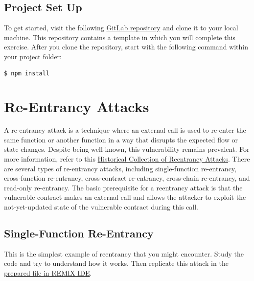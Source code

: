 \documentclass[12pt]{article}
\begin{document}

\subsection*{Project Set Up}

To get started, visit the following \href{https://gitlab.fel.cvut.cz/radovluk/smart-contracts-exercises/-/tree/main/05-Re-Entrancy/task/task-code}{GitLab repository} and clone it to your local machine. This repository contains a template in which you will complete this exercise. After you clone the repository, start with the following command within your project folder:

\begin{verbatim}
$ npm install
\end{verbatim}

\section{Re-Entrancy Attacks}

A re-entrancy attack is a technique where an external call is used to re-enter the same function or another function in a way that disrupts the expected flow or state changes. Despite being well-known, this vulnerability remains prevalent. For more information, refer to this \href{https://github.com/pcaversaccio/reentrancy-attacks?tab=readme-ov-file}{Historical Collection of Reentrancy Attacks}. There are several types of re-entrancy attacks, including single-function re-entrancy, cross-function re-entrancy, cross-contract re-entrancy, cross-chain re-entrancy, and read-only re-entrancy. The basic prerequisite for a reentrancy attack is that the vulnerable contract makes an external call and allows the attacker to exploit the not-yet-updated state of the vulnerable contract during this call.

\subsection{Single-Function Re-Entrancy}

This is the simplest example of reentrancy that you might encounter. Study the code and try to understand how it works. Then replicate this attack in the \href{https://remix.ethereum.org/?#activate=solidity&url=https://github.com/radovluk/unbreakable-vault/contracts/reentrancy01.sol&lang=en&optimize=false&runs=200&evmVersion=null&version=soljson-v0.8.28+commit.7893614a.js}{prepared file in REMIX IDE}.
\end{document}
